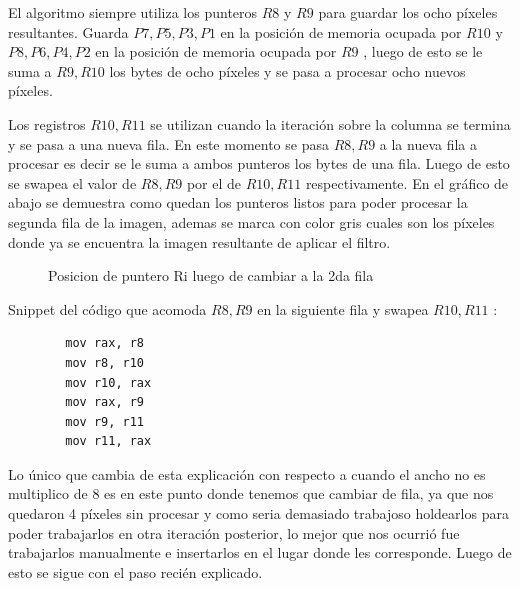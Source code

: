 El algoritmo siempre utiliza los punteros $R8$ y $R9$ para guardar los ocho píxeles resultantes. Guarda  $P7, P5, P3, P1$ en la posición de memoria ocupada por $R10$ y $P8, P6, P4, P2$ en la posición de memoria ocupada por $R9$ , luego de esto se le suma a $R9, R10$ los bytes de ocho píxeles y se pasa a procesar ocho nuevos píxeles.

Los registros $R10, R11$ se utilizan cuando la iteración sobre la columna se termina y se pasa a una nueva fila. En este momento se pasa $R8, R9$ a la nueva fila a procesar es decir se le suma a ambos punteros los bytes de una fila. Luego de esto se swapea el valor de $R8, R9$ por el de $R10, R11$ respectivamente. En el gráfico de abajo se demuestra como quedan los punteros listos para poder procesar la segunda fila de la imagen, ademas se marca con color gris cuales son los píxeles donde ya se encuentra la imagen resultante de aplicar el filtro.

\begin{figure}[H]
\centering         
{}
\caption{Posicion de puntero Ri luego de cambiar a la 2da fila}
\end{figure}

Snippet del código que acomoda $R8, R9$ en la siguiente fila y swapea $R10, R11$ :

\begin{lstlisting}
		mov rax, r8
		mov r8, r10
		mov r10, rax
		mov rax, r9
		mov r9, r11
		mov r11, rax
\end{lstlisting}

Lo único que cambia de esta explicación con respecto a cuando el ancho no es multiplico de 8 es en este punto donde tenemos que cambiar de fila, ya que nos quedaron 4 píxeles sin procesar y como seria demasiado trabajoso holdearlos para poder trabajarlos en otra iteración posterior, lo mejor que nos ocurrió fue trabajarlos manualmente e insertarlos en el lugar donde les corresponde. Luego de esto se sigue con el paso recién explicado.


